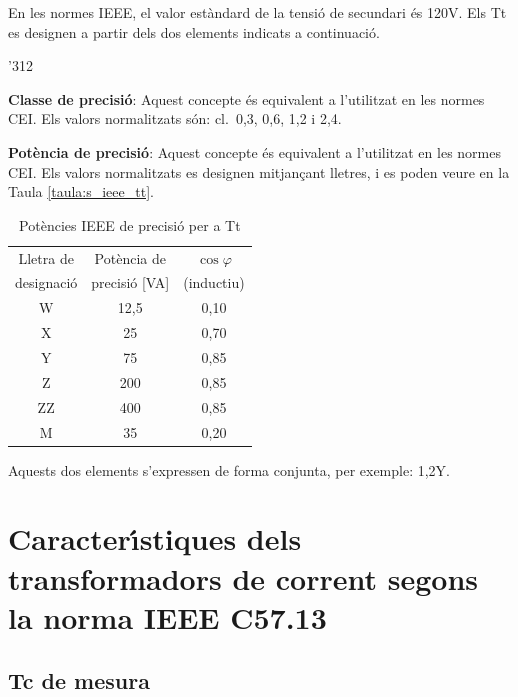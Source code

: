 En les normes \textsf{IEEE}, el valor est\`{a}ndard de la tensi\'{o} de
secundari \'{e}s 120\unit{V}. Els Tt es designen a partir dels dos
elements indicats a continuaci\'{o}.

\begin{dingautolist}{'312}
    \item \textbf{Classe de precisi\'{o}}: Aquest concepte \'{e}s equivalent
    a l'utilitzat en les normes \textsf{CEI}. Els valors
    normalitzats s\'{o}n: cl.~0,3, 0,6, 1,2 i 2,4.
    \item \textbf{Pot\`{e}ncia de precisi\'{o}}: Aquest concepte \'{e}s equivalent
    a l'utilitzat en les normes \textsf{CEI}. Els valors
    normalitzats es designen mitjan\c{c}ant lletres, i es poden veure en
    la Taula \vref{taula:s_ieee_tt}.

    \begin{table}[h]
    \caption{\label{taula:s_ieee_tt} Pot\`{e}ncies \textsf{IEEE} de precisi\'{o}  per a Tt}
    \begin{center}\begin{tabular}{ccc}
    \toprule[1pt]
    Lletra de & Pot\`{e}ncia de & $\cos\varphi$\\
    designaci\'{o} &  precisi\'{o} [VA] &  (inductiu)\\
    \midrule
        W & 12,5 & 0,10\\
        X & 25 & 0,70 \\
        Y & 75 & 0,85 \\
        Z & 200 & 0,85 \\
        ZZ & 400 & 0,85 \\
        M & 35 & 0,20 \\
    \bottomrule[1pt]
    \end{tabular} \end{center}
    \end{table}
\end{dingautolist}

Aquests dos elements s'expressen de forma conjunta, per exemple:
1,2Y.

\section{Caracter\'{\i}stiques dels transformadors de corrent segons la norma \textsf{IEEE C57.13}}


\subsection{Tc de mesura}

